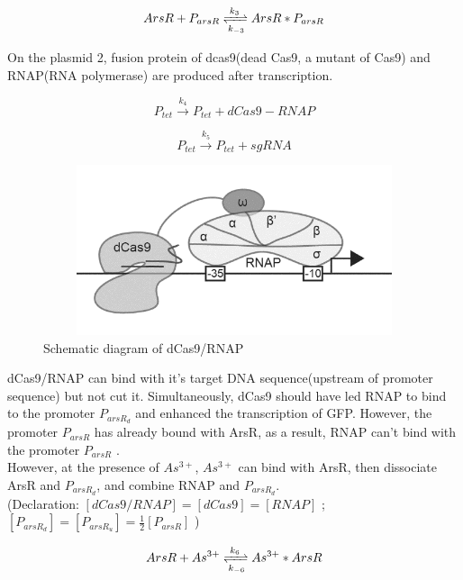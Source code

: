 \begin{equation}
ArsR+P_{arsR} \xrightleftharpoons[k_{-3}]{k_3}ArsR*P_{arsR} 
\end{equation} 

On the plasmid 2, fusion protein of dcas9(dead Cas9, a mutant of Cas9) and RNAP(RNA polymerase) are produced after transcription.

\begin{equation}
P_{tet} \stackrel{k_{4}}{\longrightarrow} P_{tet} +dCas9-RNAP
\end{equation}

\begin{equation}
P_{tet} \stackrel{k_{5}}{\longrightarrow} P_{tet} +sgRNA
\end{equation}

\begin{figure}[h]
	\centering
	\includegraphics[width=12cm,height=5cm]{2}
	\caption{Schematic diagram of dCas9/RNAP}
\end{figure}

dCas9/RNAP can bind with it's target DNA sequence(upstream of promoter sequence) but not cut it. Simultaneously, dCas9 should have led RNAP to bind to the promoter $P_{arsR_d}$ and enhanced the transcription of GFP. However, the promoter $P_{arsR}$ has already bound with ArsR, as a result, RNAP can't bind with the promoter $P_{arsR}$ .\cite{bikard2013programmable} \\ 

However, at the presence of $As^{3+}$, $As^{3+}$ can bind with ArsR, then dissociate ArsR and $P_{arsR_d}$, and combine RNAP and $P_{arsR_d}$. \\

(Declaration: $[dCas9/RNAP] = [dCas9] = [RNAP]$ ; $[P_{arsR_d}] = [P_{arsR_u}] = \frac{1}{2}[P_{arsR}]$ )

\begin{equation}
ArsR +As^{3+}\xrightleftharpoons[k_{-6}]{k_6}As^{3+}*ArsR
\end{equation}

